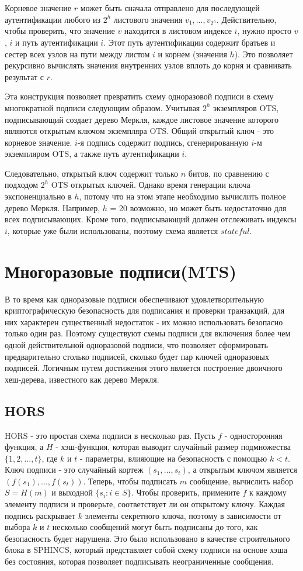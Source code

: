 \documentclass[a4paper, 14pt]{extarticle}
\begin{document}
Корневое значение $r$ может быть сначала отправлено для последующей аутентификации любого из $2^{h}$ листового значения $v_{1}, ..., v_{2^h}$. Действительно, чтобы проверить, что значение $v$ находится в листовом индексе $i$, нужно просто $v$, $i$ и путь аутентификации $i$. Этот путь аутентификации содержит братьев и сестер всех узлов на пути между листом $i$ и корнем (значения $h$). Это позволяет рекурсивно вычислять значения внутренних узлов вплоть до корня и сравнивать результат с $r$.

Эта конструкция позволяет превратить схему одноразовой подписи в схему многократной подписи следующим образом. Учитывая $2^h$ экземпляров OTS, подписывающий создает дерево Меркля, каждое листовое значение которого являются открытым ключом экземпляра OTS. Общий открытый ключ - это корневое значение. $i$-я подпись содержит подпись, сгенерированную $i$-м экземпляром OTS, а также путь аутентификации $i$.

Следовательно, открытый ключ содержит только $n$ битов, по сравнению с подходом $2^h$ OTS открытых ключей. Однако время генерации ключа экспоненциально в $h$, потому что на этом этапе необходимо вычислить полное дерево Меркля. Например, $h$ = 20 возможно, но может быть недостаточно для всех подписывающих. Кроме того, подписывающий должен отслеживать индексы $i$, которые уже были использованы, поэтому схема является $stateful$.
\newpage

\section{Многоразовые подписи(MTS)}
В то время как одноразовые подписи обеспечивают удовлетворительную криптографическую безопасность для подписания и проверки транзакций, для них характерен существенный недостаток - их можно использовать безопасно только один раз. Поэтому существуют схемы подписи для включения более чем одной действительной одноразовой подписи, что позволяет сформировать предварительно столько подписей, сколько будет пар ключей одноразовых подписей. Логичным путем достижения этого является построение двоичного хеш-дерева, известного как дерево Меркля.
\subsection{HORS}
HORS - это простая схема подписи в несколько раз. Пусть $f$ - односторонняя функция, а $H$ - хэш-функция, которая выводит случайный размер подмножества $\{1,2,...,t\}$, где $k$ и $t$ - параметры, влияющие на безопасность с помощью $k < t$. Ключ подписи - это случайный кортеж $(s_1,...,s_t)$, а открытым ключом является $(f(s_{1}),..., f(s_{t}))$. 
Теперь, чтобы подписать $m$ сообщение, вычислить набор $S = H(m)$ и выходной $\{s_{i} : i \in S\}$. Чтобы проверить, примените $f$ к каждому элементу подписи и проверьте, соответствует ли он открытому ключу. Каждая подпись раскрывает $k$ элементы секретного ключа, поэтому в зависимости от выбора $k$ и $t$ несколько сообщений могут быть подписаны до того, как безопасность будет нарушена. Это было использовано в качестве строительного блока в SPHINCS, который представляет собой схему подписи на основе хэша без состояния, которая позволяет подписывать неограниченные сообщения.
\end{document}
